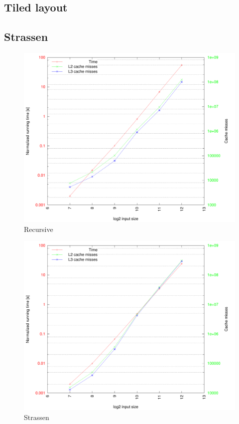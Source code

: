 \subsection{Tiled layout}

\subsection{Strassen}


\begin{figure}[h!]
  \centering
  \includegraphics[width=\textwidth]{"../project2/plots/4096/row-tiled8x8 recursive-8(tiled-bc)_column-tiled-8x8 recursive-8(generic-bc)_row-tiled8x8 recursive-8(tiled-bc)_0"}
  \caption{Recursive}
\end{figure}



\begin{figure}[h!]
  \centering
  \includegraphics[width=\textwidth]{"../project2/plots/4096/z-curve-tiled strassen-32(32-fixed-tiled-bc)_z-curve-tiled strassen-32(32-fixed-tiled-bc)_z-curve-tiled strassen-32(32-fixed-tiled-bc)_0"}
  \caption{Strassen}
\end{figure}